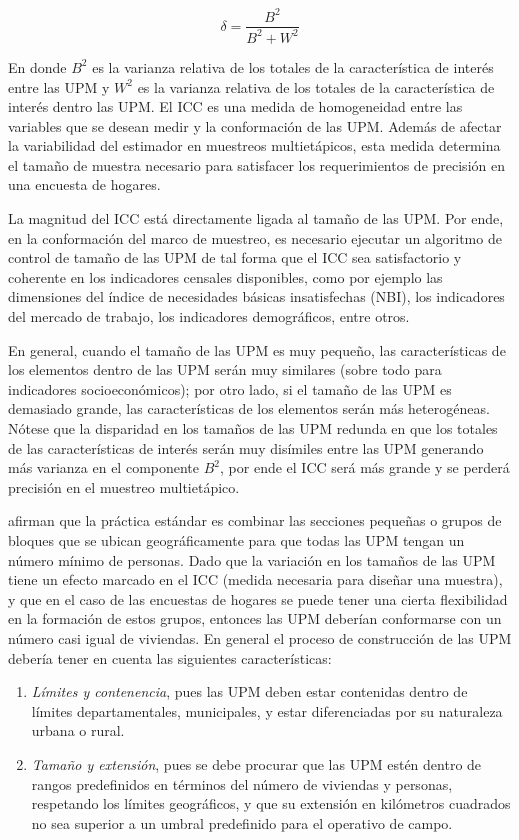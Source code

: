 \documentclass[
  10pt,
  spanish,
]{book}
\providecommand{\tightlist}{%
  \setlength{\itemsep}{0pt}\setlength{\parskip}{0pt}}
\begin{document}
\[
\delta=\frac{B^2}{B^2+W^2}
\]

En donde \(B^2\) es la varianza relativa de los totales de la característica de interés entre las UPM y \(W^2\) es la varianza relativa de los totales de la característica de interés dentro las UPM. El ICC es una medida de homogeneidad entre las variables que se desean medir y la conformación de las UPM. Además de afectar la variabilidad del estimador en muestreos multietápicos, esta medida determina el tamaño de muestra necesario para satisfacer los requerimientos de precisión en una encuesta de hogares.

La magnitud del ICC está directamente ligada al tamaño de las UPM. Por ende, en la conformación del marco de muestreo, es necesario ejecutar un algoritmo de control de tamaño de las UPM de tal forma que el ICC sea satisfactorio y coherente en los indicadores censales disponibles, como por ejemplo las dimensiones del índice de necesidades básicas insatisfechas (NBI), los indicadores del mercado de trabajo, los indicadores demográficos, entre otros.

En general, cuando el tamaño de las UPM es muy pequeño, las características de los elementos dentro de las UPM serán muy similares (sobre todo para indicadores socioeconómicos); por otro lado, si el tamaño de las UPM es demasiado grande, las características de los elementos serán más heterogéneas. Nótese que la disparidad en los tamaños de las UPM redunda en que los totales de las características de interés serán muy disímiles entre las UPM generando más varianza en el componente \(B^2\), por ende el ICC será más grande y se perderá precisión en el muestreo multietápico.

\citet{Valliant_Dever_Kreuter_2013} afirman que la práctica estándar es combinar las secciones pequeñas o grupos de bloques que se ubican geográficamente para que todas las UPM tengan un número mínimo de personas. Dado que la variación en los tamaños de las UPM tiene un efecto marcado en el ICC (medida necesaria para diseñar una muestra), y que en el caso de las encuestas de hogares se puede tener una cierta flexibilidad en la formación de estos grupos, entonces las UPM deberían conformarse con un número casi igual de viviendas. En general el proceso de construcción de las UPM debería tener en cuenta las siguientes características:

\begin{enumerate}
\def\labelenumi{\arabic{enumi}.}
\tightlist
\item
  \emph{Límites y contenencia}, pues las UPM deben estar contenidas dentro de límites departamentales, municipales, y estar diferenciadas por su naturaleza urbana o rural.
\item
  \emph{Tamaño y extensión}, pues se debe procurar que las UPM estén dentro de rangos predefinidos en términos del número de viviendas y personas, respetando los límites geográficos, y que su extensión en kilómetros cuadrados no sea superior a un umbral predefinido para el operativo de campo.
\end{enumerate}
\end{document}
